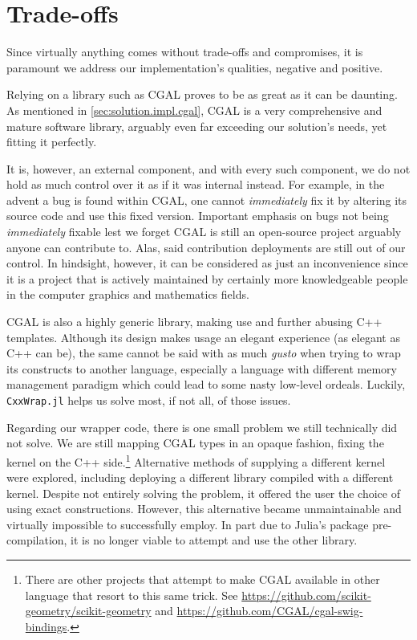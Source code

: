 \section{Trade-offs}%
\label{sec:solution.tradeoffs}

Since virtually anything comes without trade-offs and compromises, it is
paramount we address our implementation's qualities, negative and positive.

Relying on a library such as \ac{CGAL} proves to be as great as it can be
daunting.  As mentioned in \cref{sec:solution.impl.cgal}, \ac{CGAL} is a very
comprehensive and mature software library, arguably even far exceeding our
solution's needs, yet fitting it perfectly.

It is, however, an external component, and with every such component, we do not
hold as much control over it as if it was internal instead.  For example, in the
advent a bug is found within \ac{CGAL}, one cannot \emph{immediately} fix it by
altering its source code and use this fixed version.  Important emphasis on bugs
not being \emph{immediately} fixable lest we forget \ac{CGAL} is still an
open-source project arguably anyone can contribute to.  Alas, said contribution
deployments are still out of our control.  In hindsight, however, it can be
considered as just an inconvenience since it is a project that is actively
maintained by certainly more knowledgeable people in the computer graphics and
mathematics fields.

\Ac{CGAL} is also a highly generic library, making use and further abusing C++
templates.  Although its design makes usage an elegant experience (as elegant as
C++ can be), the same cannot be said with as much \emph{gusto} when trying to
wrap its constructs to another language, especially a language with different
memory management paradigm which could lead to some nasty low-level ordeals.
Luckily, \texttt{CxxWrap.jl} helps us solve most, if not all, of those issues.

Regarding our wrapper code,  there is one small problem we still technically did
not solve.  We are still mapping \ac{CGAL} types in an opaque fashion, fixing
the kernel on the C++ side.\footnote{There are other projects that attempt to
make \ac{CGAL} available in other language that resort to this same trick. See
\url{https://github.com/scikit-geometry/scikit-geometry} and
\url{https://github.com/CGAL/cgal-swig-bindings}.}  Alternative methods of
supplying a different kernel were explored, including deploying a different
library compiled with a different kernel.  Despite not entirely solving the
problem, it offered the user the choice of using exact constructions.  However,
this alternative became unmaintainable and virtually impossible to successfully
employ.  In part due to Julia's package pre-compilation, it is no longer viable
to attempt and use the other library.

